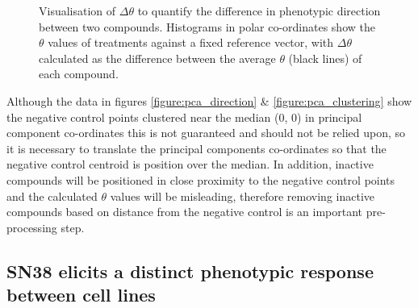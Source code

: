 \documentclass[a4paper,11pt,twoside,openright]{scrbook}
\begin{document}
\begin{figure}
    \captionsetup{width=0.8\textwidth}
    \caption[Visualisation of $\Delta\theta$ to quantify the difference in phenotypic direction between two compounds.]{
Visualisation of $\Delta\theta$ to quantify the difference in phenotypic direction between two compounds.
Histograms in polar co-ordinates show the $\theta$ values of treatments against a fixed reference vector, with $\Delta\theta$ calculated as the difference between the average $\theta$ (black lines) of each compound.
}
    
    \label{figure:theta_histogram}
\end{figure}

Although the data in figures \ref{figure:pca_direction} \& \ref{figure:pca_clustering} show the negative control points clustered near the median (0, 0) in principal component co-ordinates this is not guaranteed and should not be relied upon, so it is necessary to translate the principal components co-ordinates so that the negative control centroid is position over the median.
In addition, inactive compounds will be positioned in close proximity to the negative control points and the calculated $\theta$ values will be misleading, therefore removing inactive compounds based on distance from the negative control is an important pre-processing step.


\subsection{SN38 elicits a distinct phenotypic response between cell lines}
\end{document}
